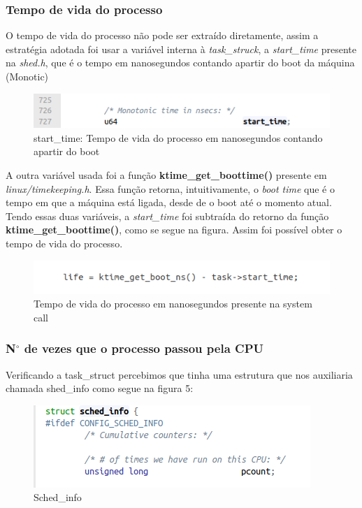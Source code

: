 \documentclass[12pt]{article}
\begin{document}
\subsubsection{Tempo de vida do processo}
O tempo de vida do processo não pode ser extraído diretamente, assim a estratégia adotada foi usar a  variável interna à \textit{task\_struck}, a \textit{start\_time} presente na \textit{shed.h}, que é o tempo em nanosegundos contando apartir do boot da máquina (Monotic) \cite{robertlinux}
 \begin{figure}[!htb]
	\centering
	\includegraphics{imagens/start.png} 
	\caption{start\_time: Tempo de vida do processo em nanosegundos contando apartir do boot}
	\label{start}
\end{figure}
A outra variável usada foi a função  \textbf{ktime\_get\_boottime()} presente em \textit{linux/timekeeping.h}. Essa função retorna, intuitivamente, o \textit{boot time} que é o tempo em que a máquina está ligada, desde de o boot até o momento atual. Tendo essas duas variáveis, a \textit{start\_time} foi subtraída do retorno da função \textbf{ktime\_get\_boottime()}, como se segue na figura. Assim foi possível obter o tempo de vida do processo. 
 \begin{figure}[!htb]
	\centering
	\includegraphics{imagens/life.png} 
	\caption{Tempo de vida do processo em nanosegundos presente na system call}
	\label{life}
\end{figure}
\subsubsection{N$^{\circ}$  de vezes que o processo passou pela CPU}
	Verificando a task\_struct percebimos que tinha uma estrutura que nos auxiliaria chamada shed\_info como segue na figura 5:
 
 \begin{figure}[!htb]
	\centering
\includegraphics[scale=0.7]{imagens/shed_info.png} 
	\caption{Sched\_info}
	\label{schedinf}
\end{figure}	
\end{document}
